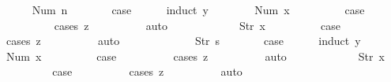 \begin{isabellebody}
\ \ \ \ \isamarkupfalse%
\ {\isacharparenleft}Num\ n{\isacharparenright}\isanewline
\ \ \ \ \isamarkupfalse%
\ \isamarkupfalse%
\ {\isacharquery}case\isanewline
\ \ \ \ \isamarkupfalse%
\ {\isacharparenleft}induct\ y{\isacharparenright}\isanewline
\ \ \ \ \ \ \isamarkupfalse%
\ {\isacharparenleft}Num\ x{\isacharparenright}\isanewline
\ \ \ \ \ \ \isamarkupfalse%
\ \isamarkupfalse%
\ {\isacharquery}case\isanewline
\ \ \ \ \ \ \ \ \isamarkupfalse%
\ {\isacharparenleft}cases\ z{\isacharparenright}\isanewline
\ \ \ \ \ \ \ \ \isamarkupfalse%
\ auto\isanewline
\ \ \ \ \isamarkupfalse%
\isanewline
\ \ \ \ \ \ \isamarkupfalse%
\ {\isacharparenleft}Str\ x{\isacharparenright}\isanewline
\ \ \ \ \ \ \isamarkupfalse%
\ \isamarkupfalse%
\ {\isacharquery}case\isanewline
\ \ \ \ \ \ \ \ \isamarkupfalse%
\ {\isacharparenleft}cases\ z{\isacharparenright}\isanewline
\ \ \ \ \ \ \ \ \isamarkupfalse%
\ auto\isanewline
\ \ \ \ \isamarkupfalse%
\isanewline
\ \ \isamarkupfalse%
\isanewline
\ \ \ \ \isamarkupfalse%
\ {\isacharparenleft}Str\ s{\isacharparenright}\isanewline
\ \ \ \ \isamarkupfalse%
\ \isamarkupfalse%
\ {\isacharquery}case\isanewline
\ \ \ \ \isamarkupfalse%
\ {\isacharparenleft}induct\ y{\isacharparenright}\isanewline
\ \ \ \ \ \ \isamarkupfalse%
\ {\isacharparenleft}Num\ x{\isacharparenright}\isanewline
\ \ \ \ \ \ \isamarkupfalse%
\ \isamarkupfalse%
\ {\isacharquery}case\isanewline
\ \ \ \ \ \ \ \ \isamarkupfalse%
\ {\isacharparenleft}cases\ z{\isacharparenright}\isanewline
\ \ \ \ \ \ \ \ \isamarkupfalse%
\ auto\isanewline
\ \ \ \ \isamarkupfalse%
\isanewline
\ \ \ \ \ \ \isamarkupfalse%
\ {\isacharparenleft}Str\ x{\isacharparenright}\isanewline
\ \ \ \ \ \ \isamarkupfalse%
\ \isamarkupfalse%
\ {\isacharquery}case\isanewline
\ \ \ \ \ \ \ \ \isamarkupfalse%
\ {\isacharparenleft}cases\ z{\isacharparenright}\isanewline
\ \ \ \ \ \ \ \ \isamarkupfalse%
\ auto\isanewline
\ \ \ \ \isamarkupfalse%
\isanewline
\ \ \isamarkupfalse%
\isanewline
{}\isamarkupfalse%
\isanewline
\ \ \isamarkupfalse%

\end{isabellebody}
